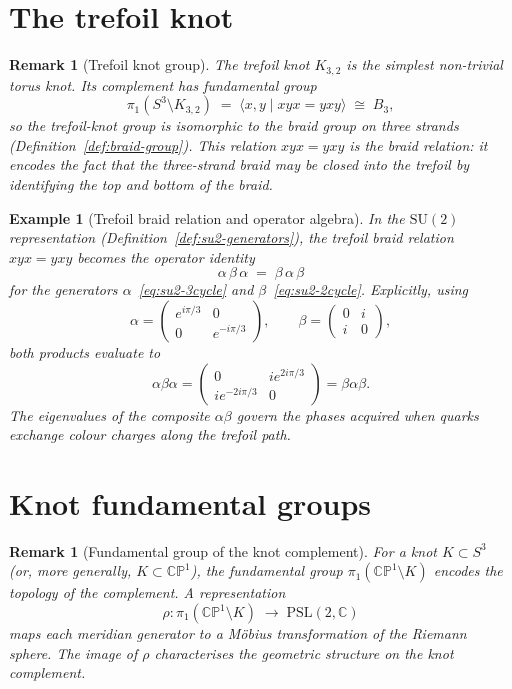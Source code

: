 \documentclass[12pt,a4paper]{report}
\newtheorem{example}[theorem]{Example}
\newtheorem{remark}[theorem]{Remark}
\begin{document}
\section{The trefoil knot}
\label{sec:trefoil-knot}

\begin{remark}[Trefoil knot group]
\label{rem:trefoil-knot-group}
The trefoil knot $K_{3,2}$ is the simplest non-trivial torus knot.  Its
complement has fundamental group
\[
  \pi_1(S^3\setminus K_{3,2})
  \;=\;\langle x,y\mid xyx=yxy\rangle
  \;\cong\;B_3,
\]
so the trefoil-knot group is isomorphic to the braid group on three
strands (Definition~\ref{def:braid-group}).  This relation $xyx=yxy$ is
the \emph{braid relation}: it encodes the fact that the three-strand
braid may be closed into the trefoil by identifying the top and bottom of
the braid.
\end{remark}

\begin{example}[Trefoil braid relation and operator algebra]
\label{ex:trefoil-operator-algebra}
In the $\mathrm{SU}(2)$ representation
(Definition~\ref{def:su2-generators}), the trefoil braid relation
$xyx=yxy$ becomes the operator identity
\[
  \alpha\,\beta\,\alpha
  \;=\;\beta\,\alpha\,\beta
\]
for the generators $\alpha$~\eqref{eq:su2-3cycle} and
$\beta$~\eqref{eq:su2-2cycle}.  Explicitly, using
\[
  \alpha=\begin{pmatrix}e^{i\pi/3}&0\\0&e^{-i\pi/3}\end{pmatrix},
  \qquad
  \beta=\begin{pmatrix}0&i\\i&0\end{pmatrix},
\]
both products evaluate to
\[
  \alpha\beta\alpha
  = \begin{pmatrix}0&ie^{2i\pi/3}\\ie^{-2i\pi/3}&0\end{pmatrix}
  = \beta\alpha\beta.
\]
The eigenvalues of the composite $\alpha\beta$ govern the phases
acquired when quarks exchange colour charges along the trefoil path.
\end{example}



\section{Knot fundamental groups}
\label{sec:knot-fundamental-groups}

\begin{remark}[Fundamental group of the knot complement]
\label{rem:knot-complement-group}
For a knot $K\subset S^3$ (or, more generally,
$K\subset\mathbb{CP}^1$), the fundamental group
$\pi_1(\mathbb{CP}^1\setminus K)$ encodes the topology of the
complement.  A representation
\[
  \rho\colon\pi_1(\mathbb{CP}^1\setminus K)
  \;\longrightarrow\;\mathrm{PSL}(2,\mathbb{C})
\]
maps each meridian generator to a M\"obius transformation of the
Riemann sphere.  The image of $\rho$ characterises the geometric
structure on the knot complement.
\end{remark}
\end{document}

